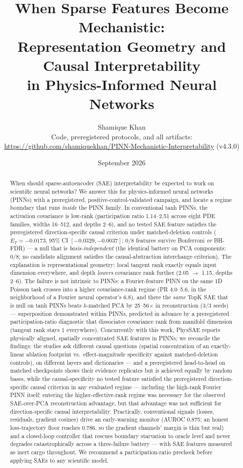 \documentclass{article}
\title{When Sparse Features Become Mechanistic:\\ Representation Geometry and Causal Interpretability\\ in Physics-Informed Neural Networks}
\author{Shamique Khan\\
\small Code, preregistered protocols, and all artifacts:\\
\small \url{https://github.com/shamiquekhan/PINN-Mechanistic-Interpretability} (v4.3.0)}
\date{September 2026}
\newcommand{\ET}{E_T}
\begin{document}
\maketitle

\begin{abstract}
When should sparse-autoencoder (SAE) interpretability be expected to work on
scientific neural networks? We answer this for physics-informed neural
networks (PINNs) with a preregistered, positive-control-validated campaign,
and locate a regime boundary that runs \emph{inside} the PINN family. In
conventional tanh PINNs, the activation covariance is low-rank (participation
ratio 1.14--2.51 across eight PDE families, widths 16--512, and depths
2--6), and no tested SAE feature satisfies the preregistered
direction-specific causal criterion under matched-deletion
controls ($\ET=-0.0173$, 95\% CI $[-0.0329,-0.0037]$; 0/8 features survive
Bonferroni \emph{or} BH-FDR) --- a null that is \emph{basis-independent}
(the identical battery on PCA components: 0/8; no candidate alignment
satisfies the causal-abstraction interchange criterion). The explanation is
representational geometry: local tangent rank exactly equals input dimension
everywhere, and depth \emph{lowers} covariance rank further (2.05 $\to$ 1.15,
depths 2--6). The failure is not intrinsic to PINNs: a Fourier-feature PINN
on the same 1D Poisson task crosses into a higher covariance-rank regime
(PR 4.0--5.6, in the neighborhood of a Fourier neural operator's 6.8), and
there the \emph{same} TopK SAE that is null on tanh PINNs beats $k$-matched
PCA by 25--56$\times$ in reconstruction (3/3 seeds) --- superposition
demonstrated within PINNs, predicted in advance by a preregistered
participation-ratio diagnostic that dissociates covariance rank from
manifold dimension (tangent rank stays 1 everywhere). Concurrently with this
work, PhysSAE reports physically aligned, spatially concentrated SAE
features in PINNs; we reconcile the findings: the studies ask different
causal questions (spatial concentration of an exactly-linear ablation
footprint vs.\ effect-magnitude specificity against matched-deletion
controls), on different layers and dictionaries --- and a preregistered
head-to-head on matched checkpoints shows their evidence replicates but
is achieved equally by random bases, while the causal-specificity
no tested feature satisfied the preregistered direction-specific
causal criterion in any evaluated regime --- including the high-rank
Fourier PINN itself: entering the higher-effective-rank regime was
necessary for the observed SAE-over-PCA reconstruction advantage, but
that advantage was not sufficient for direction-specific causal
interpretability. Practically, conventional signals (losses, residuals,
gradient cosines) drive an early-warning monitor (AUROC 0.875; an
honest loss-trajectory floor reaches 0.786, so the gradient channels'
margin is thin but real) and a closed-loop controller that rescues
boundary
starvation to oracle level and never degrades catastrophically across a
three-failure battery --- with SAE features measured as inert cargo
throughout. We recommend a participation-ratio precheck before applying
SAEs to any scientific model.
\end{abstract}
\end{document}
